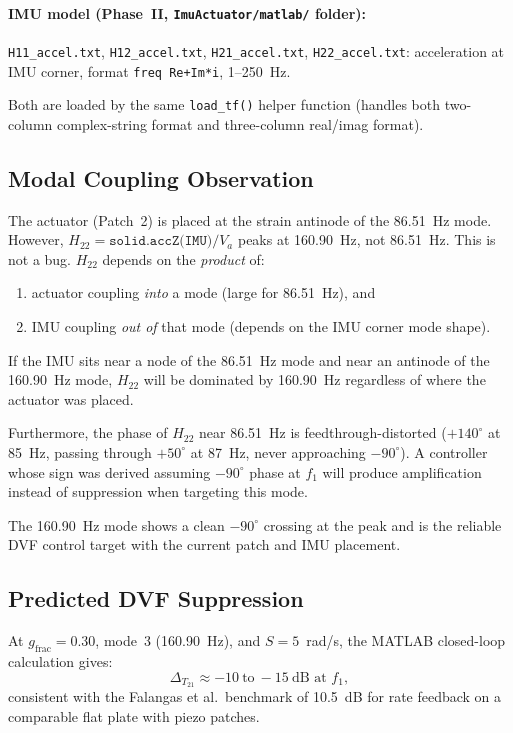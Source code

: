 \documentclass[12pt,a4paper]{article}
\begin{document}
\paragraph{IMU model (Phase~II, \texttt{ImuActuator/matlab/} folder):}
\texttt{H11\_accel.txt}, \texttt{H12\_accel.txt},
\texttt{H21\_accel.txt}, \texttt{H22\_accel.txt}:
acceleration at IMU corner, format \texttt{freq Re+Im*i}, 1--250~Hz.

Both are loaded by the same \texttt{load\_tf()} helper function (handles both
two-column complex-string format and three-column real/imag format).

\subsection{Modal Coupling Observation}

The actuator (Patch~2) is placed at the strain antinode of the 86.51~Hz mode.
However, $H_{22} = \texttt{solid.accZ(IMU)}/V_a$ peaks at 160.90~Hz, not
86.51~Hz.  This is not a bug.  $H_{22}$ depends on the \emph{product} of:
\begin{enumerate}
  \item actuator coupling \emph{into} a mode (large for 86.51~Hz), and
  \item IMU coupling \emph{out of} that mode (depends on the IMU corner mode shape).
\end{enumerate}
If the IMU sits near a node of the 86.51~Hz mode and near an antinode of the
160.90~Hz mode, $H_{22}$ will be dominated by 160.90~Hz regardless of where the
actuator was placed.

Furthermore, the phase of $H_{22}$ near 86.51~Hz is feedthrough-distorted
($+140^\circ$ at 85~Hz, passing through $+50^\circ$ at 87~Hz, never approaching
$-90^\circ$).  A controller whose sign was derived assuming $-90^\circ$ phase at
$f_1$ will produce amplification instead of suppression when targeting this mode.

The 160.90~Hz mode shows a clean $-90^\circ$ crossing at the peak and is the
reliable DVF control target with the current patch and IMU placement.

\subsection{Predicted DVF Suppression}
\label{sec:dvf_results}

At $g_\text{frac} = 0.30$, mode~3 (160.90~Hz), and $S = 5$~rad/s, the MATLAB
closed-loop calculation gives:
\begin{equation}
  \Delta_{T_{21}} \approx -10\ \text{to}\ -15\ \text{dB at } f_1,
\end{equation}
consistent with the Falangas et al.\ benchmark of 10.5~dB for rate feedback on
a comparable flat plate with piezo patches.
\end{document}
